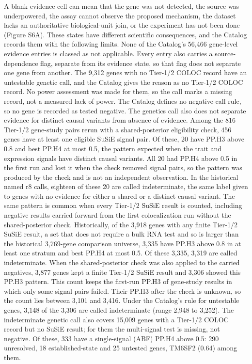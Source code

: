 A blank evidence cell can mean that the gene was not detected, the source was
underpowered, the assay cannot observe the proposed mechanism, the dataset lacks
an authoritative biological-unit join, or the experiment has not been done
(Figure S6A). These states have different scientific consequences, and the
Catalog records them with the following limits. None of the Catalog's 56,466 gene-level evidence entries is classed as not
applicable. Every entry also carries a source-dependence flag, separate from its evidence
state, so that flag does not separate one gene from another.
The 9,312 genes with no Tier-1/2 COLOC record have an untestable genetic call, and
the Catalog gives the reason as no Tier-1/2 COLOC record. No power assessment was
made for them, so the call marks a missing record, not a measured lack of power. The Catalog defines no negative-call rule, so no gene is
recorded as tested negative. The genetics call also does not separate evidence
for distinct causal variants from absence of evidence. Among the 816 Tier-1/2
gene-study pairs rerun with a shared-posterior eligibility check, 456 genes have
at least one eligible SuSiE signal pair. Of these, 20 have PP.H3 above 0.8 and
best PP.H4 at most 0.5, the pattern expected when the trait and expression
signals have distinct causal variants. All 20 had PP.H4 above 0.5 in the first
run and lost it when the check removed signal pairs, so the pattern was
produced by the check and is not an independent observation. In the historical named r8 calls, eighteen of these 20 are called
indeterminate, the same label given to genes with no evidence for either a shared
or a distinct causal variant. The same pattern is common when every Tier-1/2
SuSiE result is counted, including negative results carried forward from the
first colocalization run without the shared-posterior check. Historically, of the 3,918 genes
with any finite Tier-1/2 SuSiE result, a set that does not require a bulk RNA
test and so is larger than the historical 3,769-gene comparison universe, 3,335 have PP.H3
above 0.8 in at least one stratum and best PP.H4 at most 0.5. Of these 3,335,
3,319 are called indeterminate. When the shared-posterior check was also applied
to the carried negatives, 3,877 genes kept a finite Tier-1/2 SuSiE result and
3,306 showed this PP.H3 pattern. This count keeps the first-run PP.H3 of
gene-study results in which only some signal pairs failed. Their PP.H3 after
the check is unknown, so the count lies between 3,101 and 3,416. Under the
Catalog's rule for untestable genes, 3,148 of the 3,306 are called
indeterminate (range 2,948 to 3,252). The indeterminate genetic call also covers
15,009 genes with a Tier-1/2 COLOC record but no SuSiE result; for them the
multi-signal test is missing, not negative. Of these, 333 have a single-signal
(ABF) PP.H4 above 0.5: 290 unresolved, 18 established-state and 25 untested
genes, TM6SF2 (0.64) among them.

